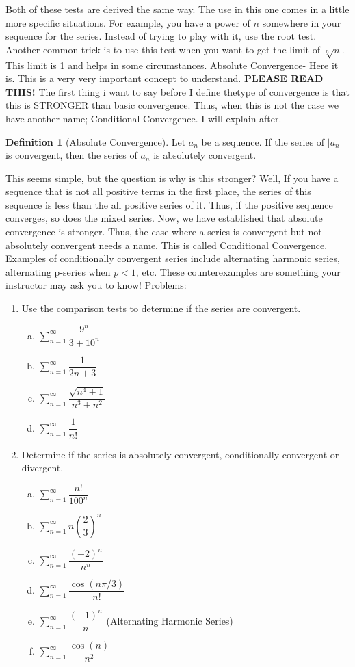 \documentclass[10pt]{article}
\newcommand{\ds}{\displaystyle}
\theoremstyle{Theorem}
\theoremstyle{definition}
\newtheorem{definition}{Definition}[section]
\theoremstyle{remark}
\theoremstyle{custom}
\begin{document}
Both of these tests are derived the same way. The use in this one comes in a little more specific situations. For example, you have a power of $n$ somewhere in your sequence for the series. Instead of trying to play with it, use the root test. Another common trick is to use this test when you want to get the limit of $\sqrt[n]{n}$. This limit is 1 and helps in some circumstances.
\newpage
\noindent Absolute Convergence- Here it is. This is a very very important concept to understand. \textbf{PLEASE READ THIS!} The first thing i want to say before I define thetype of convergence is that this is STRONGER than basic convergence. Thus, when this is not the case we have another name; Conditional Convergence. I will explain after.
\begin{definition}[Absolute Convergence]
Let $a_n$ be a sequence. If the series of $|a_n|$ is convergent, then the series of $a_n$ is absolutely convergent.
\end{definition}
This seems simple, but the question is why is this stronger? Well, If you have a sequence that is not all positive terms in the first place, the series of this sequence is less than the all positive series of it. Thus, if the positive sequence converges, so does the mixed series. Now, we have established that absolute convergence is stronger. Thus, the case where a series is convergent but not absolutely convergent needs a name. This is called Conditional Convergence. Examples of conditionally convergent series include alternating harmonic series, alternating p-series when $p<1$, etc. These counterexamples are something your instructor may ask you to know!
\newpage
Problems:
\begin{enumerate}[1.]
\item Use the comparison tests to determine if the series are convergent.
\begin{enumerate}[a.]
\item $\ds \sum_{n=1}^{\infty}\dfrac{9^n}{3+10^n}$
\item $\ds \sum_{n=1}^{\infty}\dfrac{1}{2n+3}$
\item $\ds \sum_{n=1}^{\infty} \dfrac{\sqrt{n^4+1}}{n^3+n^2}$
\item $\ds \sum_{n=1}^{\infty} \dfrac{1}{n!}$
\end{enumerate}
\item Determine if the series is absolutely convergent, conditionally convergent or divergent.
\begin{enumerate}[a.]
\item $\ds \sum_{n=1}^{\infty}\dfrac{n!}{100^n}$
\item $\ds \sum_{n=1}^{\infty} n\left(\dfrac{2}{3}\right)^n$
\item $\ds \sum_{n=1}^{\infty} \dfrac{(-2)^n}{n^n}$
\item $\ds \sum_{n=1}^{\infty} \dfrac{\cos(n\pi/3)}{n!}$
\item $\ds \sum_{n=1}^{\infty} \dfrac{(-1)^n}{n}$ (Alternating Harmonic Series)
\item $\ds \sum_{n=1}^{\infty} \dfrac{\cos(n)}{n^2}$

\end{enumerate}
\end{enumerate}
\end{document}
